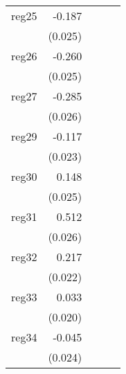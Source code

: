 {\begin{longtable}{l*{4}{D{.}{.}{-1}}}
\addlinespace
reg25       &      -0.187\sym{***}&                     &                     &                     \\
            &     (0.025)         &                     &                     &                     \\
\addlinespace
reg26       &      -0.260\sym{***}&                     &                     &                     \\
            &     (0.025)         &                     &                     &                     \\
\addlinespace
reg27       &      -0.285\sym{***}&                     &                     &                     \\
            &     (0.026)         &                     &                     &                     \\
\addlinespace
reg29       &      -0.117\sym{***}&                     &                     &                     \\
            &     (0.023)         &                     &                     &                     \\
\addlinespace
reg30       &       0.148\sym{***}&                     &                     &                     \\
            &     (0.025)         &                     &                     &                     \\
\addlinespace
reg31       &       0.512\sym{***}&                     &                     &                     \\
            &     (0.026)         &                     &                     &                     \\
\addlinespace
reg32       &       0.217\sym{***}&                     &                     &                     \\
            &     (0.022)         &                     &                     &                     \\
\addlinespace
reg33       &       0.033         &                     &                     &                     \\
            &     (0.020)         &                     &                     &                     \\
\addlinespace
reg34       &      -0.045         &                     &                     &                     \\
            &     (0.024)         &                     &                     &                     \\

\end{longtable}}
